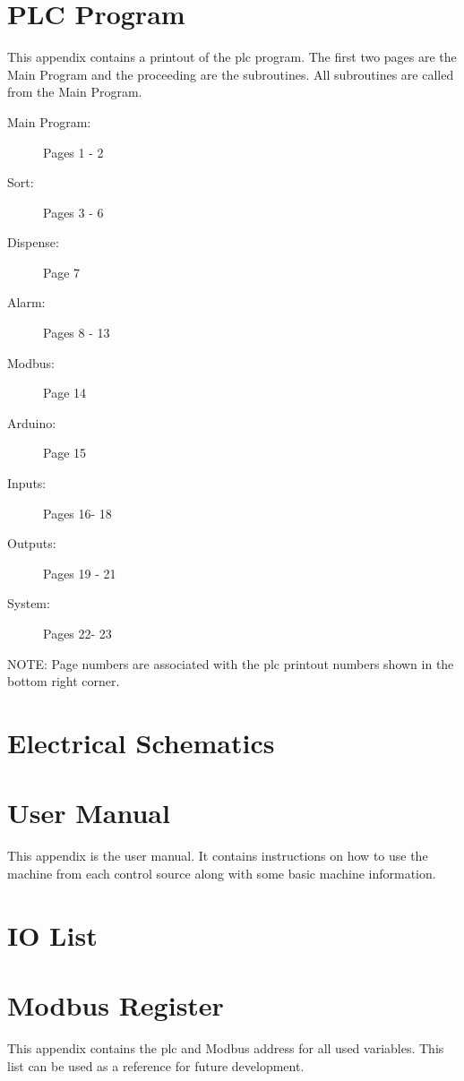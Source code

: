 \appendix

\chapter{PLC Program}  \label{app:plcProg}
    This appendix contains a printout of the \acrshort{plc} program. The first two pages are the Main Program and the proceeding are the subroutines. All subroutines are called from the Main Program.

    \begin{description}
        \item[Main Program:] Pages 1 - 2
        \item[Sort:] Pages 3 - 6
        \item[Dispense:] Page 7
        \item[Alarm:] Pages 8 - 13
        \item[Modbus:] Page 14
        \item[Arduino:] Page 15
        \item[Inputs:] Pages 16- 18
        \item[Outputs:] Pages 19 - 21
        \item[System:] Pages 22- 23
    \end{description}

    NOTE: Page numbers are associated with the \acrshort{plc} printout numbers shown in the bottom right corner. 
    
     
    
\chapter{Electrical Schematics} \label{app:elecSch}
    

\chapter{User Manual} \label{app:userGuide}
    This appendix is the user manual. It contains instructions on how to use the machine from each control source along with some basic machine information.
    

\chapter{IO List} \label{app:ioList}
    

\chapter{Modbus Register} \label{app:modbusRegister}
    This appendix contains the \acrshort{plc} and Modbus address for all used variables. This list can be used as a reference for future development.
    

